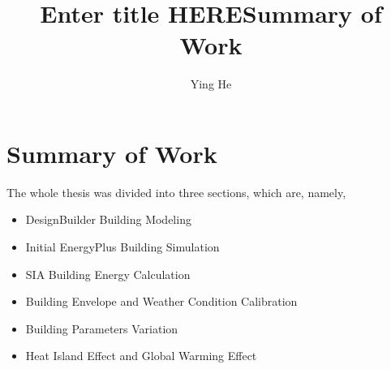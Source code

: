\documentclass[11pt, a4paper]{article}
\title{Enter title HERE}
\author{Ying He}
\theoremstyle{definition}
\newcommand{\matx}[4]{\begin{pmatrix} #1 & #2 \\ #3 & #4 \end{pmatrix}}
\newcommand{\hlor}{\colorbox{Apricot}} %
\begin{document}
\begin{comment}
	\begin{landscape}
	\begin{multicols*}{3}
\end{comment}
\begin{comment}
	\textbf{abcdefg}
	\hlor{abcd}
	\[\matx{1}{2}{3}{4}\] al;dfjajfa
	woyaozaizhedazi $\matx{1}{2}{3}{4}$
	\[\alpha \cdot \beta \]
	123456789/*
\end{comment}

\title{Summary of Work}
\maketitle

\section{Summary of Work}
	The whole thesis was divided into three sections, which are, namely,
	\begin{itemize}
		\item DesignBuilder Building Modeling
		\item Initial EnergyPlus Building Simulation
		\item SIA Building Energy Calculation
		\item Building Envelope and Weather Condition Calibration
		\item Building Parameters Variation
		\item Heat Island Effect and Global Warming Effect
	\end{itemize}
	
\end{document}
